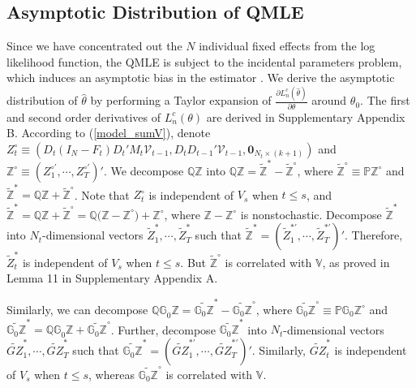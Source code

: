 \documentclass[11pt,a4paper]{article}
\begin{document}

\subsection{Asymptotic Distribution of QMLE}\label{section3.2}
Since we have concentrated out the $N$ individual fixed effects from the log likelihood function, the QMLE is subject to the incidental parameters problem, which induces an asymptotic bias in the estimator \citep{Meng21042026}.
We derive the asymptotic distribution of $\hat{\theta}$ by performing a Taylor expansion of $\frac{\partial L_n^c(\hat{\theta})}{\partial\theta}$ around $\theta_0$. The first and second order derivatives of $L_n^c(\theta)$ are derived in Supplementary Appendix  B.
According to (\ref{model_sumV}), denote $Z^\circ_t\equiv\left(D_t(I_N-F_t)D_t'M_t\mathcal{V}_{t-1},D_tD_{t-1}'\mathcal{V}_{t-1},\mathbf{0}_{N_t\times(k+1)}\right)$ and $\mathbb{Z}^\circ\equiv(Z^{\circ\prime}_1,\cdots,Z^{\circ\prime}_T)'$.
We decompose $\mathbb{QZ}$ into $\mathbb{QZ}=\widetilde{\mathbb{Z}}^{*}-\widetilde{\mathbb{Z}}^{\circ}$, where $\widetilde{\mathbb{Z}}^{\circ}\equiv\mathbb{P}\mathbb{Z}^{\circ}$ and $\widetilde{\mathbb{Z}}^{*}=\mathbb{QZ}+\widetilde{\mathbb{Z}}^{\circ}$.
Note that $Z_t^\circ$ is independent of $V_s$ when $t\leq s$, and $\widetilde{\mathbb{Z}}^{*}=\mathbb{QZ}+\widetilde{\mathbb{Z}}^{\circ}=\mathbb{Q(Z-Z}^\circ)+\mathbb{Z}^\circ$, where $\mathbb{Z-Z}^\circ$ is nonstochastic.
Decompose $\widetilde{\mathbb{Z}}^{*}$ into $N_t$-dimensional vectors $\widetilde{Z}_1^*,\cdots,\widetilde{Z}_T^*$ such that $\widetilde{\mathbb{Z}}^{*}=(\widetilde{Z}_1^{*\prime},\cdots,\widetilde{Z}_T^{*\prime})'$. Therefore, $\widetilde{Z}_t^{*}$ is independent of $V_s$ when $t\leq s$. But $\widetilde{\mathbb{Z}}^{\circ}$ is correlated with $\mathbb{V}$, as proved in Lemma 11 in Supplementary Appendix A.


Similarly, we can decompose $\mathbb{QG}_0\mathbb{Z}=\widetilde{\mathbb{G}_0\mathbb{Z}}^{*}-\widetilde{\mathbb{G}_0\mathbb{Z}}^{\circ}$, where
$\widetilde{\mathbb{G}_0\mathbb{Z}}^{\circ}\equiv\mathbb{P}\mathbb{G}_0\mathbb{Z}^{\circ}$ and $\widetilde{\mathbb{G}_0\mathbb{Z}}^{*}=\mathbb{QG}_0\mathbb{Z}+\widetilde{\mathbb{G}_0\mathbb{Z}}^{\circ}$. Further, decompose $\widetilde{\mathbb{G}_0\mathbb{Z}}^{*}$ into $N_t$-dimensional vectors $\widetilde{GZ}_1^*,\cdots,\widetilde{GZ}_T^*$ such that $\widetilde{\mathbb{G}_0\mathbb{Z}}^{*}=(\widetilde{GZ}_1^{*\prime},\cdots,\widetilde{GZ}_T^{*\prime})'$. Similarly, $\widetilde{GZ}_t^{*}$ is independent of $V_s$ when $t\le s$, whereas $\widetilde{\mathbb{G}_0\mathbb{Z}}^{\circ}$ is correlated with $\mathbb{V}$.
\end{document}
